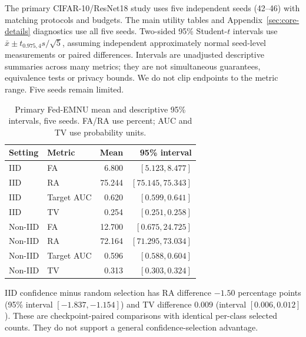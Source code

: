 \documentclass[software,article,submit,moreauthors]{Definitions/mdpi}
\begin{document}
The primary CIFAR-10/ResNet18 study uses five independent seeds (42--46) with matching protocols and budgets. The main utility tables and Appendix~\ref{sec:core-details} diagnostics use all five seeds. Two-sided 95\% Student-$t$ intervals use $\bar{x}\pm t_{0.975,4}s/\sqrt{5}$, assuming independent approximately normal seed-level measurements or paired differences. Intervals are unadjusted descriptive summaries across many metrics; they are not simultaneous guarantees, equivalence tests or privacy bounds. We do not clip endpoints to the metric range. Five seeds remain limited.

\begin{table}[H]\centering\small

\caption{Primary Fed-EMNU mean and descriptive 95\% intervals, five seeds. FA/RA use percent; AUC and TV use probability units.}

\label{tab:five-ci}

\begin{tabular}{llrr}\toprule Setting & Metric & Mean & 95\% interval\\\midrule

IID & FA & 6.800 & $[5.123, 8.477]$\\

IID & RA & 75.244 & $[75.145, 75.343]$\\

IID & Target AUC & 0.620 & $[0.599, 0.641]$\\

IID & TV & 0.254 & $[0.251, 0.258]$\\

Non-IID & FA & 12.700 & $[0.675, 24.725]$\\

Non-IID & RA & 72.164 & $[71.295, 73.034]$\\

Non-IID & Target AUC & 0.596 & $[0.588, 0.604]$\\

Non-IID & TV & 0.313 & $[0.303, 0.324]$\\

\bottomrule\end{tabular}\end{table}

IID confidence minus random selection has RA difference $-1.50$ percentage points (95\% interval $[-1.837, -1.154]$) and TV difference $0.009$ (interval $[0.006, 0.012]$). These are checkpoint-paired comparisons with identical per-class selected counts. They do not support a general confidence-selection advantage.
\end{document}
